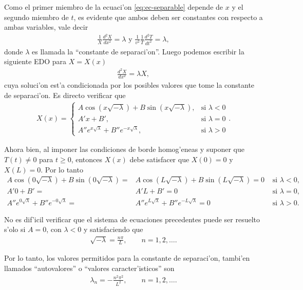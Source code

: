Como el primer miembro de la ecuaci'on \eqref{eq:ec-separable} depende de $x$ y el segundo miembro de $t$, es evidente que ambos deben ser constantes con respecto a ambas variables, vale decir
\begin{align}
\frac{1}{X}\frac{d^2 X}{dx^2}=\lambda \text{  y  }\frac{1}{v^2}\frac{1}{T}\frac{d^2 T}{dt^2}=\lambda,
\end{align}
donde $\lambda$ es llamada la ``constante de separaci'on''. Luego podemos escribir la siguiente EDO para $X=X(x)$
\begin{align}
\frac{d^2 X}{dx^2}=\lambda X,
\end{align}
cuya soluci'on est'a condicionada por los posibles valores que tome la constante de separaci'on. Es directo verificar que
\begin{align}
X(x)=
\begin{cases}
A \cos(x\sqrt{-\lambda})+B \sin(x\sqrt{-\lambda}), & \text{si }\lambda<0\\
A' x+B', & \text{si }\lambda=0\\
A'' e^{x\sqrt{\lambda}}+B'' e^{-x\sqrt{\lambda}}, & \text{si }\lambda >0
\end{cases}.
\end{align}

Ahora bien, al imponer las condiciones de borde homog'eneas y suponer que $T(t) \neq 0$ para $t \geq 0$, entonces $X(x)$ debe satisfacer que $X(0)=0$ y $X(L)=0$. Por lo tanto
\begin{align}
A \cos(0\sqrt{-\lambda})+B \sin(0\sqrt{-\lambda})=&A \cos(L\sqrt{-\lambda})+B \sin(L\sqrt{-\lambda})=0 & \text{ si }\lambda<0,\\
A' 0+B'=&A' L+B'=0 & \text{ si }\lambda=0,\\
A'' e^{0\sqrt{\lambda}}+B'' e^{-0\sqrt{\lambda}}=&A'' e^{L\sqrt{\lambda}}+B'' e^{-L\sqrt{\lambda}}=0 & \text{ si }\lambda >0.
\end{align}

No es dif'icil verificar que el sistema de ecuaciones precedentes puede ser resuelto s'olo si $A=0$, con $\lambda < 0$ y satisfaciendo que
\begin{align}
\sqrt{-\lambda}=\frac{n\pi}{L},\qquad n=1,2,\hdots.
\end{align} 

Por lo tanto, los valores permitidos para la constante de separaci'on, tambi'en llamados ``autovalores'' o ``valores caracter'isticos'' son
\begin{align}
\lambda_{n}=-\frac{n^2 \pi^2}{L^2},\qquad n=1,2,\hdots.
\end{align}

